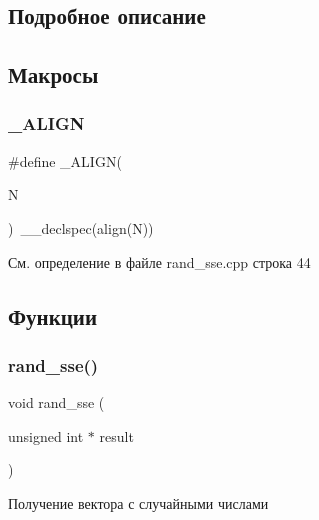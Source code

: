 \subsection{Подробное описание}


\subsection{Макросы}
\mbox{\label{group__rand__ssecpp_gae2c66d1d7db5adf0c1853960e2be1119}} 
\subsubsection{\texorpdfstring{\_ALIGN}{\_ALIGN}}
{\footnotesize\ttfamily \#define \+\_\+\+A\+L\+I\+GN(\begin{DoxyParamCaption}\item[{}]{N }\end{DoxyParamCaption})~\+\_\+\+\_\+declspec(align(N))}



См. определение в файле rand\+\_\+sse.\+cpp строка 44



\subsection{Функции}
\mbox{\label{group__rand__ssecpp_gab7ae3ab6c8fb3e31548413dd0154db7d}} 
\subsubsection{\texorpdfstring{rand\_sse()}{rand\_sse()}}
{\footnotesize\ttfamily void rand\+\_\+sse (\begin{DoxyParamCaption}\item[{unsigned int $\ast$}]{result }\end{DoxyParamCaption})}



Получение вектора с случайными числами 


\begin{DoxyCode}{0}
\end{DoxyCode}
 
